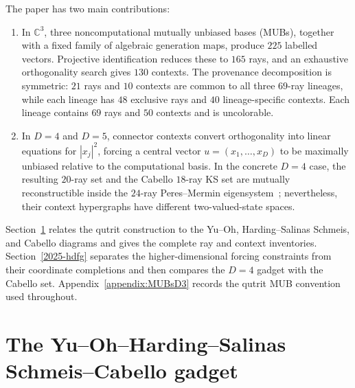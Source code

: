 \documentclass[%
  reprint,
  superscriptaddress,
  showpacs,
  showkeys,
  amsmath,amssymb,
  pra,
  longbibliography,
  floatfix,
  x11names
]{revtex4-2}
\newenvironment{revision}{\begingroup\color{revisionblue}}{\endgroup}
\begin{document}
\begin{revision}
The paper has two main contributions:
\begin{enumerate}
\item In $\mathbb{C}^3$, three noncomputational mutually unbiased bases (MUBs), together with a fixed family of algebraic generation maps, produce $225$ labelled vectors.  Projective identification reduces these to $165$ rays, and an exhaustive orthogonality search gives $130$ contexts.  The provenance decomposition is symmetric: $21$ rays and $10$ contexts are common to all three $69$-ray lineages, while each lineage has $48$ exclusive rays and $40$ lineage-specific contexts.  Each lineage contains $69$ rays and $50$ contexts and is uncolorable.
\item In $D=4$ and $D=5$, connector contexts convert orthogonality into linear equations for $|x_j|^2$, forcing a central vector $u=(x_1,\ldots,x_D)$ to be maximally unbiased relative to the computational basis.  In the concrete $D=4$ case, the resulting $20$-ray set and the Cabello $18$-ray KS set are mutually reconstructible inside the $24$-ray Peres--Mermin eigensystem~\cite{peres111,mermin90b,peres-91,pavicic-2004ksafq,cabello-96}; nevertheless, their context hypergraphs have different two-valued-state spaces.
\end{enumerate}

Section~\ref{2025-yohscg} relates the qutrit %
construction to the Yu--Oh, Harding--Salinas Schmeis, and Cabello diagrams and gives the complete ray and context inventories.  Section~\ref{2025-hdfg} separates the higher-dimensional forcing constraints from their coordinate completions and then compares the $D=4$ gadget with the Cabello set.  Appendix~\ref{appendix:MUBsD3} records the qutrit MUB convention used throughout.
\end{revision}


\section{The Yu--Oh--Harding--Salinas Schmeis--Cabello gadget}
\label{2025-yohscg}
\end{document}
